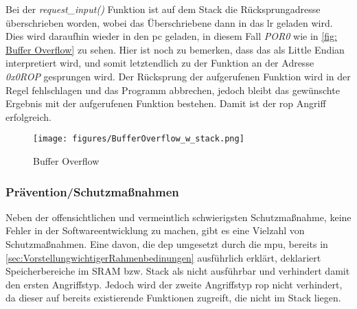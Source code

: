 \documentclass[a4paper,
DIV=13,
12pt,
BCOR=10mm,
department=FakIM,
oneside,
parskip=half,
automark,
listof=totocnumbered,
bibliography=totocnumbered,
acronym=totocnumbered
] {OTHRartcl}
\begin{document}
Bei der \textit{request\_input()} Funktion ist auf dem Stack die Rücksprungadresse überschrieben worden, wobei das Überschriebene dann in das \ac{lr} geladen wird.
Dies wird daraufhin wieder in den \ac{pc} geladen, in diesem Fall \textit{POR0} wie in \autoref{fig: Buffer Overflow} zu sehen. Hier ist noch zu bemerken, dass das als Little Endian interpretiert wird, und somit
letztendlich zu der Funktion an der Adresse \textit{0x0ROP} gesprungen wird.
Der Rücksprung der aufgerufenen Funktion wird in der Regel fehlschlagen und das Programm abbrechen, jedoch bleibt das gewünschte Ergebnis mit der aufgerufenen Funktion bestehen.
Damit ist der \ac{rop} Angriff erfolgreich. \cite{IEEE Xplore ROP} \cite{OWASP Buffer Overflow Attack}
\begin{figure}[ht!]
  \begin{center}
    \texttt{[image: figures/BufferOverflow\_w\_stack.png]}
    \caption{Buffer Overflow}
    \label{fig: Buffer Overflow}
  \end{center}
\end{figure}

\subsubsection{Prävention/Schutzmaßnahmen}
Neben der offensichtlichen und vermeintlich schwierigsten Schutzmaßnahme, keine Fehler in der Softwareentwicklung zu machen, gibt es eine Vielzahl von Schutzmaßnahmen.
Eine davon, die \ac{dep} umgesetzt durch die \ac{mpu}, bereits in \autoref{sec:VorstellungwichtigerRahmenbedinungen} ausführlich erklärt, deklariert Speicherbereiche im SRAM bzw. Stack als nicht ausführbar
und verhindert damit den ersten Angriffstyp. Jedoch wird der zweite Angriffstyp \ac{rop} nicht verhindert, da dieser auf bereits existierende Funktionen zugreift, die nicht im Stack liegen.
\end{document}
